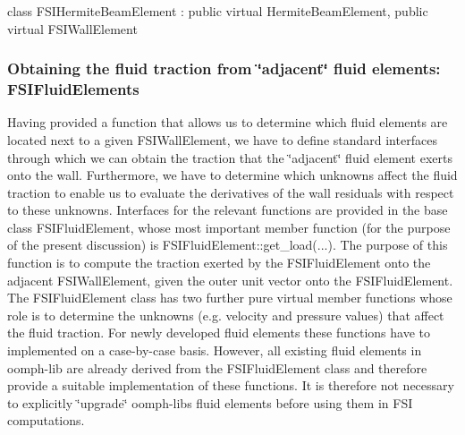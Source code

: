 \begin{DoxyCode}
\textcolor{keyword}{class }FSIHermiteBeamElement : \textcolor{keyword}{public} \textcolor{keyword}{virtual} HermiteBeamElement, 
                              \textcolor{keyword}{public} \textcolor{keyword}{virtual} FSIWallElement
\end{DoxyCode}
\hypertarget{index_fsi_fluid_elements}{}\subsubsection{Obtaining the fluid traction from \char`\"{}adjacent\char`\"{} fluid elements\+: F\+S\+I\+Fluid\+Elements}\label{index_fsi_fluid_elements}
Having provided a function that allows us to determine which fluid elements are located next to a given {\ttfamily F\+S\+I\+Wall\+Element}, we have to define standard interfaces through which we can obtain the traction that the \char`\"{}adjacent\char`\"{} fluid element exerts onto the wall. Furthermore, we have to determine which unknowns affect the fluid traction to enable us to evaluate the derivatives of the wall residuals with respect to these unknowns. Interfaces for the relevant functions are provided in the base class {\ttfamily F\+S\+I\+Fluid\+Element}, whose most important member function (for the purpose of the present discussion) is {\ttfamily F\+S\+I\+Fluid\+Element\+::get\+\_\+load}(...). The purpose of this function is to compute the traction exerted by the {\ttfamily F\+S\+I\+Fluid\+Element} onto the adjacent {\ttfamily F\+S\+I\+Wall\+Element}, given the outer unit vector onto the {\ttfamily F\+S\+I\+Fluid\+Element}. The {\ttfamily F\+S\+I\+Fluid\+Element} class has two further pure virtual member functions whose role is to determine the unknowns (e.\+g. velocity and pressure values) that affect the fluid traction. For newly developed fluid elements these functions have to implemented on a case-\/by-\/case basis. However, all existing fluid elements in {\ttfamily oomph-\/lib} are already derived from the {\ttfamily F\+S\+I\+Fluid\+Element} class and therefore provide a suitable implementation of these functions. It is therefore not necessary to explicitly \char`\"{}upgrade\char`\"{} {\ttfamily oomph-\/lib\textquotesingle{}s} fluid elements before using them in F\+SI computations.



 

